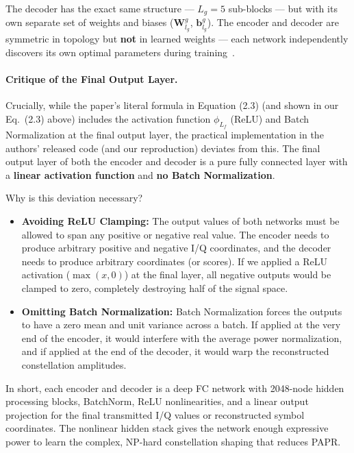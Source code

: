 The decoder has the exact same structure --- $L_g = 5$ sub-blocks --- but with its own separate set of weights and biases ($\bm{W}_{l_g}^g$, $\bm{b}_{l_g}^g$).  The encoder and decoder are symmetric in topology but \textbf{not} in learned weights --- each network independently discovers its own optimal parameters during training~\cite{kim2017novel}.

\paragraph{Critique of the Final Output Layer.}
Crucially, while the paper's literal formula in Equation (2.3) (and shown in our Eq.~(2.3) above) includes the activation function $\phi_{L_f}$ (ReLU) and Batch Normalization at the final output layer, the practical implementation in the authors' released code (and our reproduction) deviates from this. The final output layer of both the encoder and decoder is a pure fully connected layer with a \textbf{linear activation function} and \textbf{no Batch Normalization}.

Why is this deviation necessary?
\begin{itemize}
    \item \textbf{Avoiding ReLU Clamping:} The output values of both networks must be allowed to span any positive or negative real value. The encoder needs to produce arbitrary positive and negative I/Q coordinates, and the decoder needs to produce arbitrary coordinates (or scores). If we applied a ReLU activation ($\max(x, 0)$) at the final layer, all negative outputs would be clamped to zero, completely destroying half of the signal space.
    \item \textbf{Omitting Batch Normalization:} Batch Normalization forces the outputs to have a zero mean and unit variance across a batch. If applied at the very end of the encoder, it would interfere with the average power normalization, and if applied at the end of the decoder, it would warp the reconstructed constellation amplitudes.
\end{itemize}

In short, each encoder and decoder is a deep FC network with 2048-node hidden processing blocks, BatchNorm, ReLU nonlinearities, and a linear output projection for the final transmitted I/Q values or reconstructed symbol coordinates. The nonlinear hidden stack gives the network enough expressive power to learn the complex, NP-hard constellation shaping that reduces PAPR.


